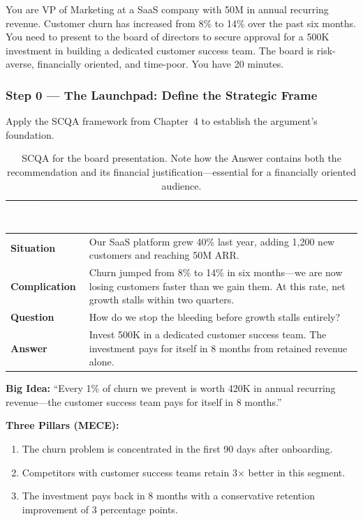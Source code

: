 \begin{thesisbox}
You are VP of Marketing at a SaaS company with \texteuro{}50M in annual recurring revenue. Customer churn has increased from 8\% to 14\% over the past six months. You need to present to the board of directors to secure approval for a \texteuro{}500K investment in building a dedicated customer success team. The board is risk-averse, financially oriented, and time-poor. You have 20 minutes.
\end{thesisbox}

\subsubsection*{Step 0 --- The Launchpad: Define the Strategic Frame}

Apply the SCQA framework from Chapter~4 to establish the argument's foundation.

\begin{table}[H]
\centering
\small
{}
\begin{tabularx}{\textwidth}{>{\bfseries\color{heading}}l X}
\toprule
\rowcolor{tableheader}
\textcolor{white}{\textbf{SCQA Element}} & \textcolor{white}{\textbf{Content}} \\
\midrule
Situation & Our SaaS platform grew 40\% last year, adding 1,200 new customers and reaching \texteuro{}50M ARR. \\
Complication & Churn jumped from 8\% to 14\% in six months---we are now losing customers faster than we gain them. At this rate, net growth stalls within two quarters. \\
Question & How do we stop the bleeding before growth stalls entirely? \\
Answer & Invest \texteuro{}500K in a dedicated customer success team. The investment pays for itself in 8 months from retained revenue alone. \\
\bottomrule
\end{tabularx}
\caption{SCQA for the board presentation. Note how the Answer contains both the recommendation and its financial justification---essential for a financially oriented audience.}
\end{table}

\noindent\textbf{Big Idea:} ``Every 1\% of churn we prevent is worth \texteuro{}420K in annual recurring revenue---the customer success team pays for itself in 8 months.''

\noindent\textbf{Three Pillars (MECE):}
\begin{enumerate}
  \item The churn problem is concentrated in the first 90 days after onboarding.
  \item Competitors with customer success teams retain 3$\times$ better in this segment.
  \item The investment pays back in 8 months with a conservative retention improvement of 3 percentage points.
\end{enumerate}

